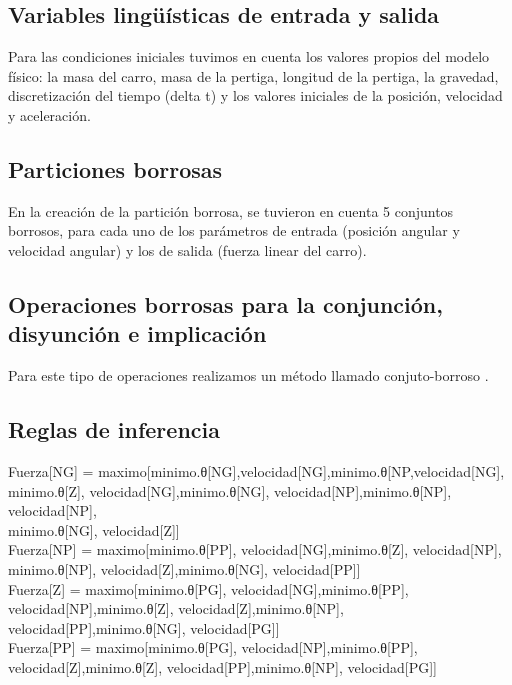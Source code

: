 \documentclass{article}
\begin{document}
\subsection{Variables lingüísticas de entrada y salida}

Para las condiciones iniciales tuvimos en cuenta los valores propios del modelo físico: la masa del carro, masa de la pertiga, longitud de la pertiga, la gravedad, discretización del tiempo (delta t) y los valores iniciales de la posición, velocidad y aceleración.

\subsection{Particiones borrosas}

En la creación de la partición borrosa, se tuvieron en cuenta 5 conjuntos borrosos, para cada uno de los parámetros de entrada (posición angular y velocidad angular) y los de salida (fuerza linear del carro).

\subsection{Operaciones borrosas para la conjunción, disyunción e implicación}

Para este tipo de operaciones realizamos un método llamado conjuto-borroso .

\subsection{Reglas de inferencia}

Fuerza[NG] = maximo[minimo.θ[NG],velocidad[NG],minimo.θ[NP,velocidad[NG],\\minimo.θ[Z], velocidad[NG],minimo.θ[NG], velocidad[NP],minimo.θ[NP], velocidad[NP],\\minimo.θ[NG], velocidad[Z]]\\

Fuerza[NP] = maximo[minimo.θ[PP], velocidad[NG],minimo.θ[Z], velocidad[NP],\\minimo.θ[NP], velocidad[Z],minimo.θ[NG], velocidad[PP]]\\

Fuerza[Z] = maximo[minimo.θ[PG], velocidad[NG],minimo.θ[PP], velocidad[NP],minimo.θ[Z], velocidad[Z],minimo.θ[NP], velocidad[PP],minimo.θ[NG], velocidad[PG]]\\

Fuerza[PP] = maximo[minimo.θ[PG], velocidad[NP],minimo.θ[PP], velocidad[Z],minimo.θ[Z], velocidad[PP],minimo.θ[NP], velocidad[PG]]\\
\end{document}
